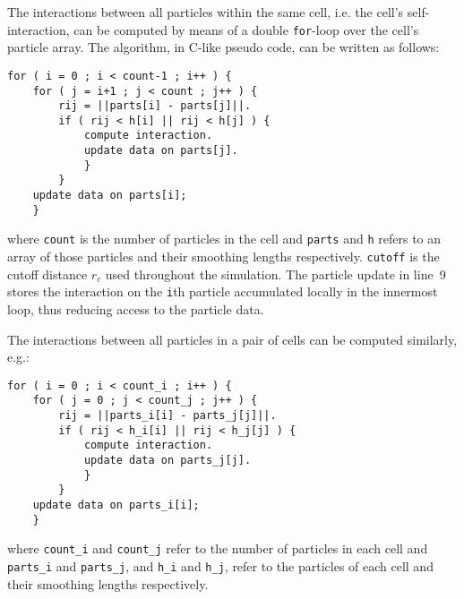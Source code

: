 \documentclass[final]{siamltex}
\begin{document}
The interactions between all particles within the same cell,
i.e. the cell's self-interaction, can be computed by means of
a double {\tt for}-loop over the cell's particle array.
The algorithm, in C-like pseudo code, can be written as follows:

\begin{center}\begin{minipage}{0.8\textwidth}
    \begin{lstlisting}
for ( i = 0 ; i < count-1 ; i++ ) {
    for ( j = i+1 ; j < count ; j++ ) {
        rij = ||parts[i] - parts[j]||.
        if ( rij < h[i] || rij < h[j] ) {
            compute interaction.
            update data on parts[j].
            }
        }
    update data on parts[i];
    }
    \end{lstlisting}
\end{minipage}\end{center}

\noindent where {\tt count} is the number of particles in the
cell and {\tt parts} and {\tt h} refers to an array of those
particles and their smoothing lengths respectively.
{\tt cutoff} is the cutoff distance $r_c$ used throughout the
simulation.
The particle update in line~9 stores the interaction on the
{\tt i}th particle accumulated locally in the innermost loop,
thus reducing access to the particle data.

The interactions between all particles in a pair of cells
can be computed similarly, e.g.:
   
\begin{center}\begin{minipage}{0.8\textwidth}
    \begin{lstlisting}
for ( i = 0 ; i < count_i ; i++ ) {
    for ( j = 0 ; j < count_j ; j++ ) {
        rij = ||parts_i[i] - parts_j[j]||.
        if ( rij < h_i[i] || rij < h_j[j] ) {
            compute interaction.
            update data on parts_j[j].
            }
        }
    update data on parts_i[i];
    }
    \end{lstlisting}
\end{minipage}\end{center}

\noindent where {\tt count\_i} and {\tt count\_j} refer to
the number of particles in each cell and {\tt parts\_i} and
{\tt parts\_j}, and {\tt h\_i} and {\tt h\_j}, refer to the
particles of each cell and their smoothing lengths respectively.
\end{document}
